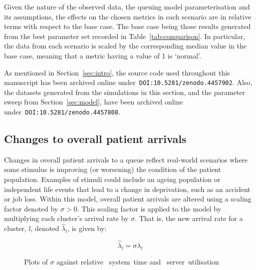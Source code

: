 \documentclass[]{interact}
\newlength{\imgwidth}
\theoremstyle{plain}%
\theoremstyle{definition}
\theoremstyle{remark}
\begin{document}
Given the nature of the observed data, the queuing model parameterisation and
its assumptions, the effects on the chosen metrics in each scenario are in
relative terms with respect to the base case. The base case being those results
generated from the best parameter set recorded in Table~\ref{tab:comparison}. In
particular, the data from each scenario is scaled by the corresponding median
value in the base case, meaning that a metric having a value of 1 is `normal'.

As mentioned in Section~\ref{sec:intro}, the source code used throughout this
manuscript has been archived online under~\texttt{DOI:10.5281/zenodo.4457902}.
Also, the datasets generated from the simulations in this section, and the
parameter sweep from Section~\ref{sec:model}, have been archived online
under~\texttt{DOI:10.5281/zenodo.4457808}.


\subsection{Changes to overall patient arrivals}\label{subsec:arrivals}

Changes in overall patient arrivals to a queue reflect real-world scenarios
where some stimulus is improving (or worsening) the condition of the patient
population. Examples of stimuli could include an ageing population or
independent life events that lead to a change in deprivation, such as an
accident or job loss. Within this model, overall patient arrivals are altered
using a scaling factor denoted by \(\sigma > 0\). This scaling factor is applied
to the model by multiplying each cluster's arrival rate by \(\sigma\). That is,
the new arrival rate for a cluster, \(l\), denoted \(\hat\lambda_l\), is given
by:

\begin{equation}\label{eq:lambda}
    \hat\lambda_{l} = \sigma\lambda_l
\end{equation}

\begin{figure}
    \centering

    \caption{%
        Plots of \(\sigma\) against relative
        ~system~time and
        ~server~utilisation
    }\label{fig:lambda}
\end{figure}
\end{document}
